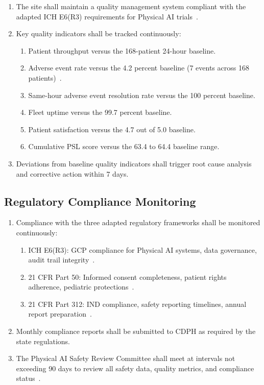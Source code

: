 \begin{enumerate}[label=(\alph*)]
\item The site shall maintain a quality management system compliant with the
  adapted ICH E6(R3) requirements for Physical AI
  trials~\cite{iche6r3adapt}.

\item Key quality indicators shall be tracked continuously:
  \begin{enumerate}[label=(\arabic*)]
  \item Patient throughput versus the 168-patient 24-hour baseline.
  \item Adverse event rate versus the 4.2 percent baseline (7 events across
    168 patients)~\cite{newtrial2026}.
  \item Same-hour adverse event resolution rate versus the 100 percent
    baseline.
  \item Fleet uptime versus the 99.7 percent baseline.
  \item Patient satisfaction versus the 4.7 out of 5.0 baseline.
  \item Cumulative PSL score versus the 63.4 to 64.4 baseline range.
  \end{enumerate}

\item Deviations from baseline quality indicators shall trigger root cause
  analysis and corrective action within 7 days.
\end{enumerate}

\subsection{Regulatory Compliance Monitoring}

\begin{enumerate}[label=(\alph*)]
\item Compliance with the three adapted regulatory frameworks shall be
  monitored continuously:
  \begin{enumerate}[label=(\arabic*)]
  \item ICH E6(R3): GCP compliance for Physical AI systems, data governance,
    audit trail integrity~\cite{iche6r3adapt}.
  \item 21 CFR Part 50: Informed consent completeness, patient rights
    adherence, pediatric protections~\cite{cfr50adapt}.
  \item 21 CFR Part 312: IND compliance, safety reporting timelines, annual
    report preparation~\cite{cfr312adapt}.
  \end{enumerate}

\item Monthly compliance reports shall be submitted to CDPH as required by
  the state regulations.

\item The Physical AI Safety Review Committee shall meet at intervals not
  exceeding 90 days to review all safety data, quality metrics, and
  compliance status~\cite{cfr312adapt}.
\end{enumerate}

